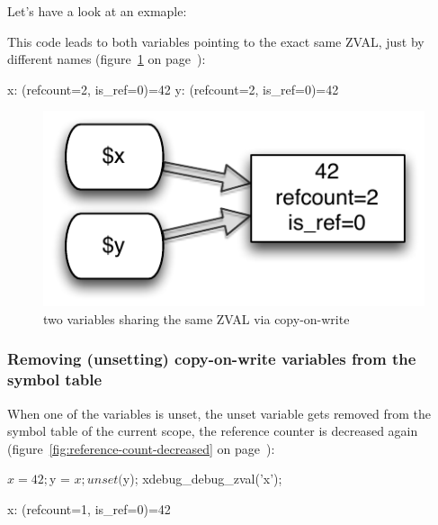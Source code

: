 Let's have a look at an exmaple:


This code leads to both variables pointing to the exact same ZVAL, just by different names (figure~\ref{fig:copy-on-write-variable} on page~\pageref{fig:copy-on-write-variable}):

\begin{textcode}
x: (refcount=2, is_ref=0)=42
y: (refcount=2, is_ref=0)=42
\end{textcode}

\begin{figure}[!h]
  \begin{center}
    \includegraphics[scale=0.8]{images/x_y_42}
    \caption{two variables sharing the same ZVAL via copy-on-write}
    \label{fig:copy-on-write-variable}
  \end{center}
\end{figure}


\subsubsection{Removing (unsetting) copy-on-write variables from the symbol table}
\label{sec:unsetting}

When one of the variables is unset, the unset variable gets removed from the symbol table of the current scope, the reference counter is decreased again (figure~\ref{fig:reference-count-decreased} on page~\pageref{fig:reference-count-decreased}):

\begin{phpcode}
$x = 42;
$y = $x;
unset($y);
xdebug_debug_zval('x');
\end{phpcode}

\begin{textcode}
x: (refcount=1, is_ref=0)=42
\end{textcode}

